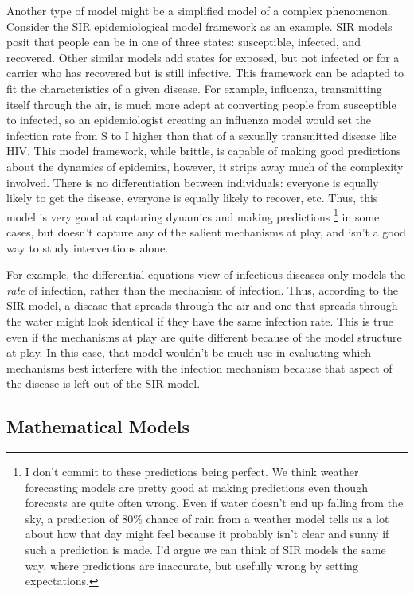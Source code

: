 Another type of model might be a simplified model of a complex
phenomenon. Consider the SIR epidemiological model framework as an
example. SIR models posit that people can be in one of three states:
susceptible, infected, and recovered. Other similar models add states
for exposed, but not infected or for a carrier who has recovered but is
still infective. This framework can be adapted to fit the
characteristics of a given disease. For example, influenza, transmitting
itself through the air, is much more adept at converting people from
susceptible to infected, so an epidemiologist creating an influenza
model would set the infection rate from S to I higher than that of a
sexually transmitted disease like HIV. This model framework, while
brittle, is capable of making good predictions about the dynamics of
epidemics, however, it strips away much of the complexity involved.
There is no differentiation between individuals: everyone is equally
likely to get the disease, everyone is equally likely to recover, etc.
Thus, this model is very good at capturing dynamics and making
predictions \footnote{I don't commit to these predictions being perfect.
  We think weather forecasting models are pretty good at making
  predictions even though forecasts are quite often wrong. Even if water
  doesn't end up falling from the sky, a prediction of 80\% chance of
  rain from a weather model tells us a lot about how that day might feel
  because it probably isn't clear and sunny if such a prediction is
  made. I'd argue we can think of SIR models the same way, where
  predictions are inaccurate, but usefully wrong by setting
  expectations.} in some cases, but doesn't capture any of the salient
mechanisms at play, and isn't a good way to study interventions alone.

For example, the differential equations view of infectious diseases only
models the \emph{rate} of infection, rather than the mechanism of
infection. Thus, according to the SIR model, a disease that spreads
through the air and one that spreads through the water might look
identical if they have the same infection rate. This is true even if the
mechanisms at play are quite different because of the model structure at
play. In this case, that model wouldn't be much use in evaluating which
mechanisms best interfere with the infection mechanism because that
aspect of the disease is left out of the SIR model.

\hypertarget{mathematical-models}{%
\subsection{Mathematical Models}\label{mathematical-models}}

